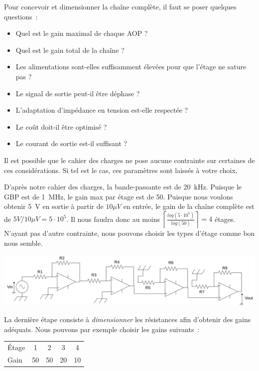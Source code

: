 Pour concevoir et dimensionner la chaîne complète, il faut se poser quelques questions~:

\begin{itemize}
  \item Quel est le gain maximal de chaque AOP ?
  \item Quel est le gain total de la chaîne ?
  \item Les alimentations sont-elles suffisamment élevées pour que l'étage ne sature pas ?
  \item Le signal de sortie peut-il être déphase ?
  \item L'adaptation d'impédance en tension est-elle respectée ?
  \item Le coût doit-il être optimisé ?
  \item Le courant de sortie est-il suffisant ?
\end{itemize}

Il est possible que le cahier des charges ne pose aucune contrainte sur certaines de ces considérations.
Si tel est le cas, ces paramètres sont laissés à votre choix.

D'après notre cahier des charges, la bande-passante est de 20~kHz.
Puisque le GBP est de 1~MHz, le gain max par étage est de 50.
Puisque nous voulons obtenir 5~V en sortie à partir de $10 \mu V$ en entrée, le gain de la chaîne complète est de $5V/10\mu V = 5\cdot 10^5$.
Il nous faudra donc au moins $\left\lceil \frac{log(5\cdot 10^5)}{log(50)} \right\rceil = 4$ étages.
N'ayant pas d'autre contrainte, nous pouvons choisir les types d'étage comme bon nous semble.

\includegraphics[width=\textwidth]{chaine-AOP.drawio.png}

La dernière étape consiste à \textit{dimensionner} les résistances afin d'obtenir des gains adéquats.
Nous pouvons par exemple choisir les gains suivants~:
\begin{center}
\begin{tabular}{|l|cccc|}\hline
Étage & 1 & 2 & 3 & 4 \\
Gain & 50 & 50 & 20 & 10 \\ \hline
\end{tabular}
\end{center}

